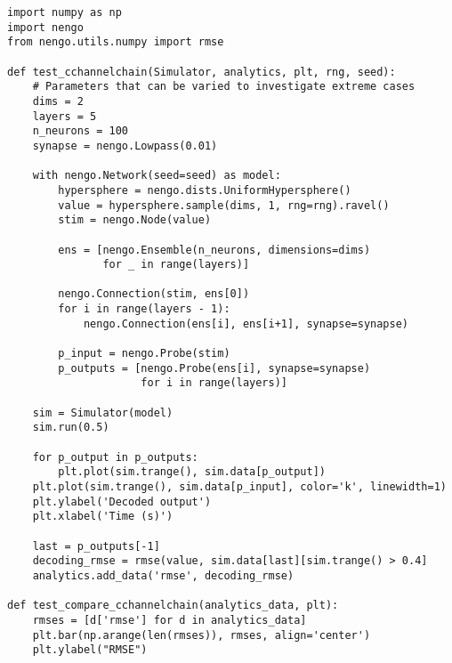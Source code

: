\documentclass{frontiersSCNS}
\begin{document}
\begin{lstlisting}
import numpy as np
import nengo
from nengo.utils.numpy import rmse

def test_cchannelchain(Simulator, analytics, plt, rng, seed):
    # Parameters that can be varied to investigate extreme cases
    dims = 2
    layers = 5
    n_neurons = 100
    synapse = nengo.Lowpass(0.01)

    with nengo.Network(seed=seed) as model:
        hypersphere = nengo.dists.UniformHypersphere()
        value = hypersphere.sample(dims, 1, rng=rng).ravel()
        stim = nengo.Node(value)

        ens = [nengo.Ensemble(n_neurons, dimensions=dims)
               for _ in range(layers)]

        nengo.Connection(stim, ens[0])
        for i in range(layers - 1):
            nengo.Connection(ens[i], ens[i+1], synapse=synapse)

        p_input = nengo.Probe(stim)
        p_outputs = [nengo.Probe(ens[i], synapse=synapse)
                     for i in range(layers)]

    sim = Simulator(model)
    sim.run(0.5)

    for p_output in p_outputs:
        plt.plot(sim.trange(), sim.data[p_output])
    plt.plot(sim.trange(), sim.data[p_input], color='k', linewidth=1)
    plt.ylabel('Decoded output')
    plt.xlabel('Time (s)')

    last = p_outputs[-1]
    decoding_rmse = rmse(value, sim.data[last][sim.trange() > 0.4]
    analytics.add_data('rmse', decoding_rmse)

def test_compare_cchannelchain(analytics_data, plt):
    rmses = [d['rmse'] for d in analytics_data]
    plt.bar(np.arange(len(rmses)), rmses, align='center')
    plt.ylabel("RMSE")
\end{lstlisting}
\end{document}
